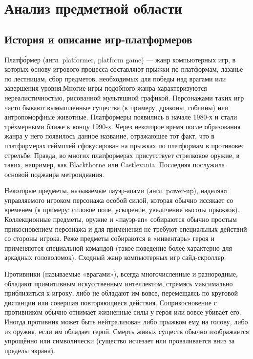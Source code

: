 \section{Анализ предметной области}
\subsection{История и описание игр-платформеров}

Платфо́рмер (англ. platformer, platform game) — жанр компьютерных игр, в которых основу игрового процесса составляют прыжки по платформам, лазанье по лестницам, сбор предметов, необходимых для победы над врагами или завершения уровня.Многие игры подобного жанра характеризуются нереалистичностью, рисованной мультяшной графикой. Персонажами таких игр часто бывают вымышленные существа (к примеру, драконы, гоблины) или антропоморфные животные.
Платформеры появились в начале 1980-х и стали трёхмерными ближе к концу 1990-х. Через некоторое время после образования жанра у него появилось данное название, отражающее тот факт, что в платформерах геймплей сфокусирован на прыжках по платформам в противовес стрельбе. Правда, во многих платформерах присутствует стрелковое оружие, в таких, например, как Blackthorne или Castlevania. Последняя послужила основой поджанра метроидвания. 

Некоторые предметы, называемые пауэр-апами (англ. power-up), наделяют управляемого игроком персонажа особой силой, которая обычно иссякает со временем (к примеру: силовое поле, ускорение, увеличение высоты прыжков). Коллекционные предметы, оружие и «пауэр-ап» собираются обычно простым прикосновением персонажа и для применения не требуют специальных действий со стороны игрока. Реже предметы собираются в «инвентарь» героя и применяются специальной командой (такое поведение более характерно для аркадных головоломок). Сходный жанр компьютерных игр сайд-скроллер.

Противники (называемые «врагами»), всегда многочисленные и разнородные, обладают примитивным искусственным интеллектом, стремясь максимально приблизиться к игроку, либо не обладают им вовсе, перемещаясь по круговой дистанции или совершая повторяющиеся действия. Соприкосновение с противником обычно отнимает жизненные силы у героя или вовсе убивает его. Иногда противник может быть нейтрализован либо прыжком ему на голову, либо из оружия, если им обладает герой. Смерть живых существ обычно изображается упрощённо или символически (существо исчезает или проваливается вниз за пределы экрана).

